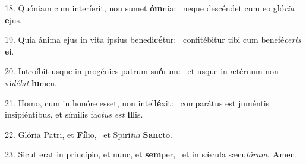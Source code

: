 18. Quóniam cum interíerit, non sumet \textbf{óm}nia: \ast\  neque descéndet cum eo gló\textit{ri}\textit{a} \textbf{e}jus.\

19. Quia ánima ejus in vita ipsíus benedi\textbf{cé}tur: \ast\  confitébitur tibi cum benefé\textit{ce}\textit{ris} \textbf{e}i.\

20. Introíbit usque in progénies patrum su\textbf{ó}rum: \ast\  et usque in ætérnum non vi\textit{dé}\textit{bit} \textbf{lu}men.\

21. Homo, cum in honóre esset, non intel\textbf{lé}xit: \ast\  comparátus est juméntis insipiéntibus, et símilis fac\textit{tus} \textit{est} \textbf{il}lis.\

22. Glória Patri, et \textbf{Fí}lio, \ast\  et Spirí\textit{tu}\textit{i} \textbf{Sanc}to.\

23. Sicut erat in princípio, et nunc, et \textbf{sem}per, \ast\  et in sǽcula sæcu\textit{ló}\textit{rum}. \textbf{A}men.\

